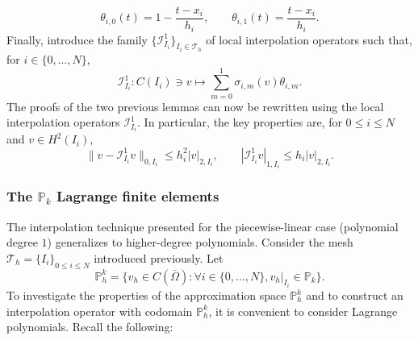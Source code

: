 \documentclass{article}
\begin{document}
$$ \theta_{i,0}(t) = 1 - \frac{t - x_i}{h_i},\qquad \theta_{i,1}(t) = \frac{t - x_i}{h_i}. $$
Finally, introduce the family $\{\mathcal{I}_{I_i}^1\}_{I_i \in \mathcal{T}_h}$ of local interpolation operators such that, for $i \in \{0, \dots, N\}$,
$$ \mathcal{I}_{I_i}^1: C(I_i) \ni v \mapsto \sum_{m=0}^1 \sigma_{i,m}(v) \theta_{i,m}. $$
The proofs of the two previous lemmas can now be rewritten using the local interpolation operators $\mathcal{I}_{I_i}^1$. In particular, the key properties are, for $0 \le i \le N$ and $v \in H^2(I_i)$,
$$ \|v - \mathcal{I}_{I_i}^1 v\|_{0,I_i} \le h_i^2 |v|_{2,I_i},\qquad|\mathcal{I}_{I_i}^1 v|_{1,I_i} \le h_i |v|_{2,I_i}. $$

\subsubsection{The $\mathbb{P}_k$ Lagrange finite elements}
The interpolation technique presented for the piecewise-linear case (polynomial degree $1$) generalizes to higher-degree polynomials. Consider the mesh $\mathcal{T}_h = \{I_i\}_{0 \le i \le N}$ introduced previously. Let
$$ \mathbb{P}_h^k = \{ v_h \in C(\bar{\Omega}): \forall i \in \{0, \dots, N\}, v_h|_{I_i} \in \mathbb{P}_k \}. $$
To investigate the properties of the approximation space $\mathbb{P}_h^k$ and to construct an interpolation operator with codomain $\mathbb{P}_h^k$, it is convenient to consider Lagrange polynomials. Recall the following:
\end{document}
